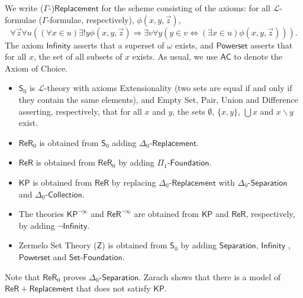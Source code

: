 \documentclass[11pt, a4paper]{article}
\newcounter{Theor1}
\newcounter{Ex1}
\begin{document}
We write ($\Gamma$-)$\textsf{Replacement}$ for the scheme consisting of the axioms: for all $\mathcal{L}$-formulae ($\Gamma$-formulae, respectively), $\phi(x, y, \vec{z})$,
\[
\forall \vec{z} \forall u ((\forall x \in u) \exists! y \phi(x, y, \vec{z}) \Rightarrow \exists v \forall y (y \in v \iff (\exists x \in u)\phi(x, y, \vec{z}))).
\]
The axiom $\textsf{Infinity}$ asserts that a superset of $\omega$ exists, and $\textsf{Powerset}$ asserts that for all $x$, the set of all subsets of $x$ exists. As usual, we use $\mathsf{AC}$ to denote the Axiom of Choice. 
\begin{itemize}
\item $\mathsf{S}_0$ is $\mathcal{L}$-theory with axioms \textsf{Extensionality} (two sets are equal if and only if they contain the same elements), and \textsf{Empty Set}, \textsf{Pair}, \textsf{Union} and \textsf{Difference} asserting, respectively, that for all $x$ and $y$, the sets $\emptyset$, $\{x, y\}$, $\bigcup x$ and $x \backslash y$ exist.
\item $\mathsf{ReR}_0$ is obtained from $\mathsf{S}_0$ adding $\Delta_0\textsf{-Replacement}$.
\item $\mathsf{ReR}$ is obtained from $\mathsf{ReR}_0$ by adding $\Pi_1\textsf{-Foundation}$.
\item $\mathsf{KP}$ is obtained from $\mathsf{ReR}$ by replacing $\Delta_0\textsf{-Replacement}$ with $\Delta_0\textsf{-Separation}$ and $\Delta_0\textsf{-Collection}$.
\item The theories $\mathsf{KP}^{\neg \infty}$ and $\mathsf{ReR}^{\neg \infty}$ are obtained from $\mathsf{KP}$ and $\mathsf{ReR}$, respectively, by adding $\neg \textsf{Infinity}$.
\item Zermelo Set Theory ($\mathsf{Z}$) is obtained from $\mathsf{S}_0$ by adding $\textsf{Separation}$, $\textsf{Infinity}$ , $\textsf{Powerset}$ and $\textsf{Set-Foundation}$. 
\end{itemize}
Note that $\mathsf{ReR}_0$ proves $\Delta_0\textsf{-Separation}$. Zarach \cite{zar96} shows that there is a model of $\mathsf{ReR}+\mathsf{Replacement}$ that does not satisfy $\mathsf{KP}$.
\end{document}
